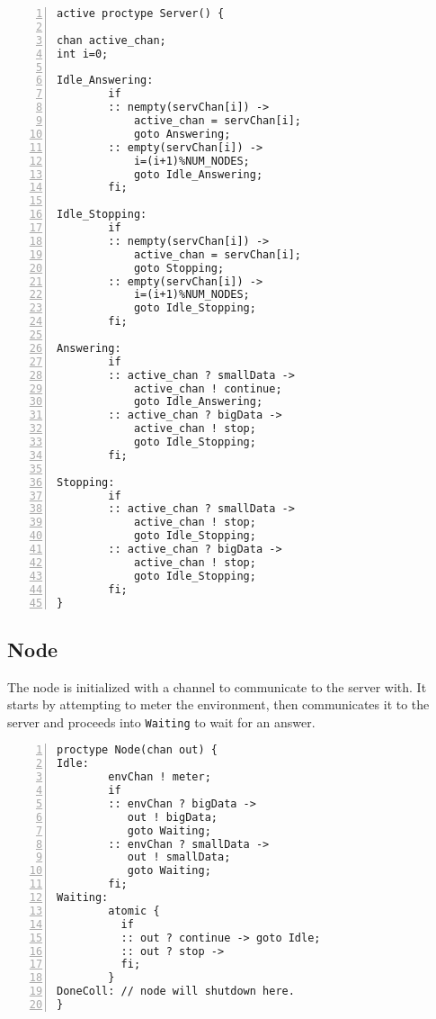 \begin{lstlisting}[caption=Server code,language=Promela, numbers=left, basicstyle=\footnotesize, tabsize=2]
active proctype Server() {
   
chan active_chan;
int i=0;

Idle_Answering: 
        if
        :: nempty(servChan[i]) -> 
            active_chan = servChan[i];
            goto Answering; 
        :: empty(servChan[i]) ->
            i=(i+1)%NUM_NODES;
            goto Idle_Answering;
        fi;

Idle_Stopping:
        if
        :: nempty(servChan[i]) -> 
            active_chan = servChan[i]; 
            goto Stopping; 
        :: empty(servChan[i]) ->
            i=(i+1)%NUM_NODES;
            goto Idle_Stopping;
        fi;

Answering: 
        if
        :: active_chan ? smallData -> 
            active_chan ! continue; 
            goto Idle_Answering;
        :: active_chan ? bigData ->
            active_chan ! stop;
            goto Idle_Stopping;
        fi;

Stopping:    
        if
        :: active_chan ? smallData -> 
            active_chan ! stop; 
            goto Idle_Stopping;
        :: active_chan ? bigData ->
            active_chan ! stop;
            goto Idle_Stopping;
        fi;
}
\end{lstlisting}

\subsection{Node}

The node is initialized with a channel to communicate to the server with. It starts by attempting to meter the environment, then communicates it to the server and proceeds into \texttt{Waiting} to wait for an answer.  

\begin{lstlisting}[caption=Server code,language=Promela, numbers=left, basicstyle=\footnotesize, tabsize=2]
proctype Node(chan out) {
Idle:   
        envChan ! meter; 
        if
        :: envChan ? bigData -> 
           out ! bigData; 
           goto Waiting;
        :: envChan ? smallData -> 
           out ! smallData; 
           goto Waiting;
        fi;
Waiting:
        atomic {
          if
          :: out ? continue -> goto Idle;
          :: out ? stop -> 
          fi;
        }
DoneColl: // node will shutdown here.
}
\end{lstlisting}

